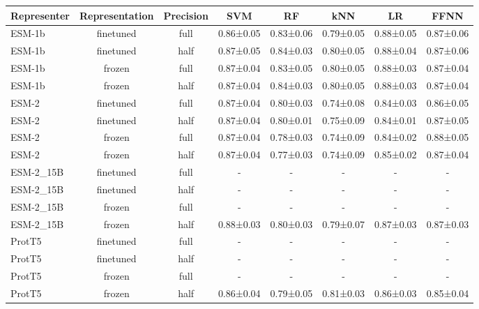 \begin{tabular}{lccccccc}
\toprule
 \textbf{Representer} & \textbf{Representation} & \textbf{Precision} &       \textbf{SVM} &        \textbf{RF} &       \textbf{kNN} &        \textbf{LR} &      \textbf{FFNN} \\
\midrule
      ESM-1b &      finetuned &      full & 0.86±0.05 & 0.83±0.06 & 0.79±0.05 & 0.88±0.05 & 0.87±0.06 \\
      ESM-1b &      finetuned &      half & 0.87±0.05 & 0.84±0.03 & 0.80±0.05 & 0.88±0.04 & 0.87±0.06 \\
      ESM-1b &         frozen &      full & 0.87±0.04 & 0.83±0.05 & 0.80±0.05 & 0.88±0.03 & 0.87±0.04 \\
      ESM-1b &         frozen &      half & 0.87±0.04 & 0.84±0.03 & 0.80±0.05 & 0.88±0.03 & 0.87±0.04 \\
       ESM-2 &      finetuned &      full & 0.87±0.04 & 0.80±0.03 & 0.74±0.08 & 0.84±0.03 & 0.86±0.05 \\
       ESM-2 &      finetuned &      half & 0.87±0.04 & 0.80±0.01 & 0.75±0.09 & 0.84±0.01 & 0.87±0.05 \\
       ESM-2 &         frozen &      full & 0.87±0.04 & 0.78±0.03 & 0.74±0.09 & 0.84±0.02 & 0.88±0.05 \\
       ESM-2 &         frozen &      half & 0.87±0.04 & 0.77±0.03 & 0.74±0.09 & 0.85±0.02 & 0.87±0.04 \\
   ESM-2\_15B &      finetuned &      full &         - &         - &         - &         - &         - \\
   ESM-2\_15B &      finetuned &      half &         - &         - &         - &         - &         - \\
   ESM-2\_15B &         frozen &      full &         - &         - &         - &         - &         - \\
   ESM-2\_15B &         frozen &      half & 0.88±0.03 & 0.80±0.03 & 0.79±0.07 & 0.87±0.03 & 0.87±0.03 \\
      ProtT5 &      finetuned &      full &         - &         - &         - &         - &         - \\
      ProtT5 &      finetuned &      half &         - &         - &         - &         - &         - \\
      ProtT5 &         frozen &      full &         - &         - &         - &         - &         - \\
      ProtT5 &         frozen &      half & 0.86±0.04 & 0.79±0.05 & 0.81±0.03 & 0.86±0.03 & 0.85±0.04 \\

\end{tabular}

